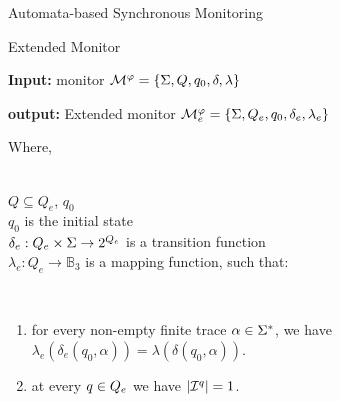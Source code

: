 \begin{frame}{Automata-based Synchronous Monitoring}
\begin{block}{Extended \LTLtri Monitor}


\textbf{Input:} \LTLtri monitor  $\mathcal{M}^\varphi = \{ \Sigma, Q, q_0, \delta , \lambda\}$ 

\textbf{output:}  Extended \LTLtri monitor $\mathcal{M}^\varphi_e = \{ \Sigma, Q_e, 
q_0, \delta_e , \lambda_e\}$

Where, 

\ \\

$Q \subseteq Q_e$, $q_0$ \\
$q_0$ is the initial state\\
$\delta_e: Q_e \times \Sigma \rightarrow 2^{Q_e}$ is a transition function\\
$\lambda_e : Q_e \rightarrow \mathbb{B}_3 $ is a mapping function, such that: 

\ \\

\begin{enumerate}

\item for every non-empty finite trace $\alpha \in \Sigma^*$, we have $\lambda_e 
(\delta_e(q_0, \alpha)) = \lambda (\delta(q_0, \alpha))$.

\item at every 
$q \in Q_e$ we have $|\mathcal{I}^q| = 1$. 


\end{enumerate}

\end{block}
\end{frame}








